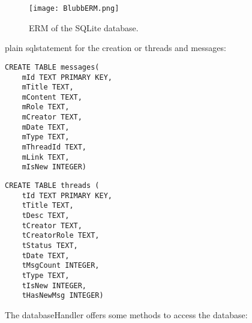 \documentclass[12pt,a4paper,oneside]{report}
\begin{document}
\begin{figure}[!ht]
	\centering
    \texttt{[image: BlubbERM.png]}
	\caption{ERM of the SQLite database.}
\end{figure}


plain sqlstatement for the creation or threads and messages:
\lstset{language=SQL}
\begin{lstlisting}
CREATE TABLE messages(
	mId TEXT PRIMARY KEY,
	mTitle TEXT,
	mContent TEXT,
	mRole TEXT,
	mCreator TEXT,
	mDate TEXT,
	mType TEXT,
	mThreadId TEXT,
	mLink TEXT,
	mIsNew INTEGER)
\end{lstlisting}
\begin{lstlisting}
CREATE TABLE threads (
	tId TEXT PRIMARY KEY,
	tTitle TEXT,
	tDesc TEXT,
	tCreator TEXT,
	tCreatorRole TEXT,
	tStatus TEXT,
	tDate TEXT, 
	tMsgCount INTEGER,
	tType TEXT,
	tIsNew INTEGER,
	tHasNewMsg INTEGER)
\end{lstlisting}
\lstset{language=Java}

The databaseHandler offers some methods to access the database:
\end{document}
